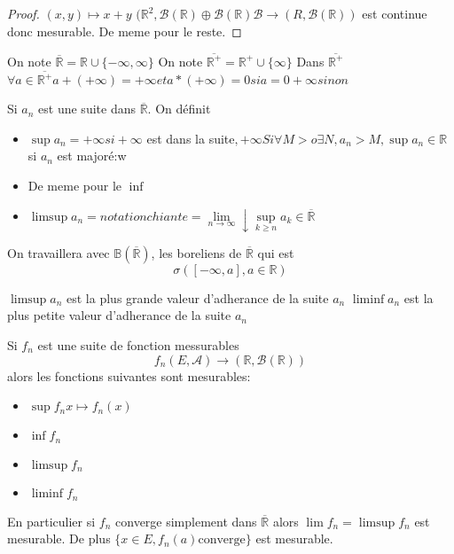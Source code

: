 \begin{proof}
	$(x,y) \mapsto x + y$
	$(\mathbb{R}^2, \mathscr{B}(\mathbb{R}) \oplus \mathscr{B}(\mathbb{R})  \mathscr{B} \rightarrow (R,   \mathscr{B}(\mathbb{R})) $
	est continue donc mesurable. De meme pour le reste.
\end{proof}


\begin{definition}
	On note $\overline{\mathbb{R}} = \mathbb{R} \cup \{ -\infty, \infty \}$
	On note $\overline{\mathbb{R^+}} = \mathbb{R}^+ \cup \{  \infty \}$
	Dans $\overline{\mathbb{R^+}}$
	$\forall a \in \overline{\mathbb{R^+}} a + (+\infty) = +\infty et a * (+\infty) = 0 si a = 0 +\infty sinon$
\end{definition}

\begin{definition}
	Si $a_n$ est une suite dans $\overline{\mathbb{R}}$. On définit
	\begin{itemize}
		\item $\sup a_n = +\infty si +\infty$ est dans la suite$, +\infty Si \forall M > o \exists N, a_n > M, \sup a_n \in \mathbb{R}$ si $a_n$ est majoré:w
		\item De meme pour le $\inf$
		\item $\limsup a_n = notation chiante = \lim\limits_{n \rightarrow \infty}\downarrow \sup\limits_{k \geq n } a_k \in \overline{\mathbb{R}}$

	\end{itemize}
\end{definition}


\begin{remarque}
	On travaillera avec $\mathbb{B}(\overline{\mathbb{R}})$, les boreliens de $\overline{\mathbb{R}}$ qui est
	$$\sigma ({[-\infty, a], a \in \mathbb{R}})$$
\end{remarque}


\begin{remarque}
	$\limsup a_n$ est la plus grande valeur d'adherance de la suite $a_n$
	$\liminf a_n$ est la plus petite valeur d'adherance de la suite $a_n$
\end{remarque}

\begin{prop}
	Si $f_n$ est une suite de fonction messurables
	$$f_n (E,\mathscr{A}) \rightarrow (\mathbb{R},\mathscr{B}(\mathbb{R}))$$
	alors les fonctions suivantes sont mesurables:
	\begin{itemize}
		\item $\sup f_n x\mapsto f_n(x) $
		\item $\inf f_n$
		\item $\limsup f_n$
		\item $\liminf f_n$
	\end{itemize}
	En particulier si $f_n$ converge simplement dans $\overline{\mathbb{R}}$ alors
	$\lim f_n = \limsup f_n$ est mesurable. De plus $\{ x \in E, f_n(a) \text{converge}\}$ est mesurable.
\end{prop}


